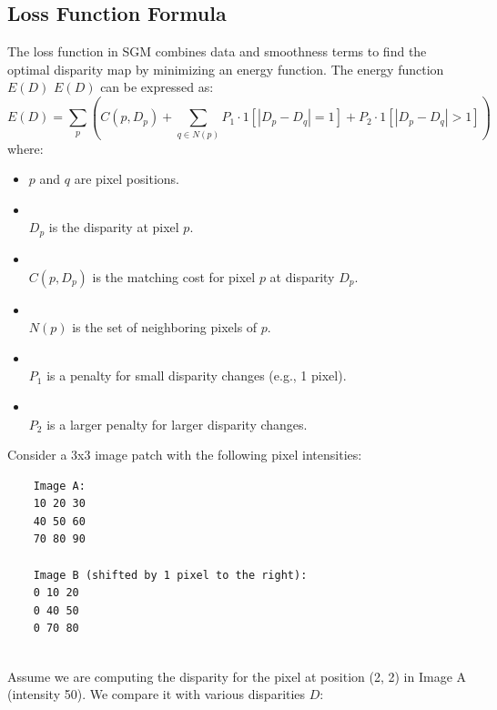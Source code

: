 \documentclass[22pt]{report}
\begin{document}
        \subsection{Loss Function Formula}
             The loss function in SGM combines data and smoothness terms to find the optimal disparity map by minimizing an energy function. The energy function 
            \( E(D) \)
            \( E(D) \) can be expressed as:
            \[ E(D) = \sum_p \left( C(p,D_p) + \sum_{q \in N(p)} P_1 \cdot 1[|D_p - D_q| = 1] + P_2 \cdot 1[|D_p - D_q| > 1] \right) \] where:
            \begin{itemize}
                \item \( p \) and \( q \) are pixel positions.
                \item \\ \( D_p \) is the disparity at pixel \( p \).
                \item \\ \( C(p, D_p) \) is the matching cost for pixel \( p \) at disparity \( D_p \).
                \item \\ \( N(p) \) is the set of neighboring pixels of \( p \).
                \item \\ \( P_1 \) is a penalty for small disparity changes (e.g., 1 pixel).
                \item \\ \( P_2 \) is a larger penalty for larger disparity changes.
            \end{itemize}
            \vspace{10}
            Consider a 3x3 image patch with the following pixel intensities: \begin{verbatim}
    Image A:
    10 20 30
    40 50 60
    70 80 90
    
    Image B (shifted by 1 pixel to the right):
    0 10 20
    0 40 50
    0 70 80
    \end{verbatim}
 \\ Assume we are computing the disparity for the pixel at position (2, 2) in Image A (intensity 50). We compare it with various disparities \(D\):
\end{document}
